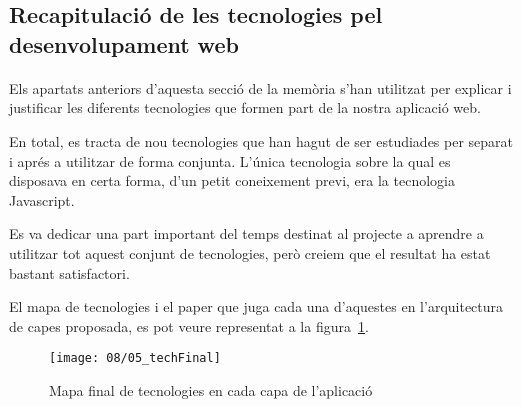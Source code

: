 \subsection{Recapitulació de les tecnologies pel desenvolupament web}

    \paragraph{}
    Els apartats anteriors d'aquesta secció de la memòria s'han utilitzat per explicar i justificar les diferents tecnologies que formen part de la nostra aplicació web.

    En total, es tracta de nou tecnologies que han hagut de ser estudiades per separat i aprés a utilitzar de forma conjunta. L'única tecnologia sobre la qual es disposava en certa forma, d'un petit coneixement previ, era la tecnologia Javascript.

    Es va dedicar una part important del temps destinat al projecte a aprendre a utilitzar tot aquest conjunt de tecnologies, però creiem que el resultat ha estat bastant satisfactori.

    El mapa de tecnologies i el paper que juga cada una d'aquestes en l'arquitectura de capes proposada, es pot veure representat a la figura~\ref{fig:finalTech}.

    \begin{figure}[h]
        \texttt{[image: 08/05\_techFinal]}
        \centering
        \caption{Mapa final de tecnologies en cada capa de l'aplicació}\label{fig:finalTech}
    \end{figure}
